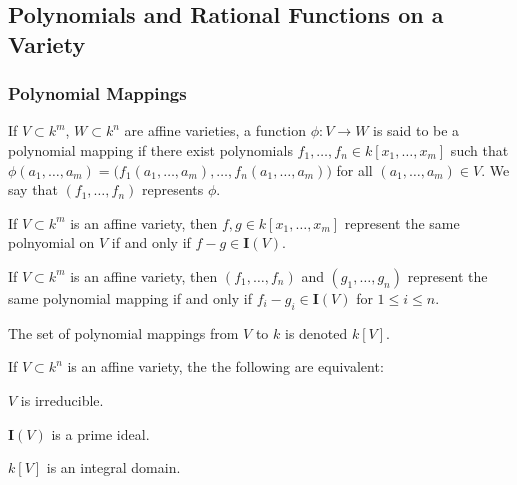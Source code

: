 \documentclass[crop=false,class=book]{standalone}
\begin{document}
\subsection{Polynomials and Rational Functions on a Variety}
\subsubsection{Polynomial Mappings}
\begin{definition}
If $V\subset k^m$, $W\subset k^n$ are affine varieties, a function $\phi:V\rightarrow W$ is said to be a polynomial mapping if there exist polynomials $f_1,\hdots, f_n\in k[x_1,\hdots, x_m]$ such that $\phi(a_1,\hdots, a_m) = \big(f_1(a_1,\hdots, a_m),\hdots, f_n(a_1,\hdots, a_m)\big)$ for all $(a_1,\hdots, a_m) \in V$. We say that $(f_1,\hdots, f_n)$ represents $\phi$.
\end{definition}
\begin{theorem}
If $V\subset k^m$ is an affine variety, then $f,g\in k[x_1,\hdots, x_m]$ represent the same polnyomial on $V$ if and only if $f-g \in \textbf{I}(V)$.
\end{theorem}
\begin{theorem}
If $V\subset k^m$ is an affine variety, then $(f_1,\hdots, f_n)$ and $(g_1,\hdots, g_n)$ represent the same polynomial mapping if and only if $f_i-g_i \in \textbf{I}(V)$ for $1\leq i \leq n$.
\end{theorem}
\begin{notation}
The set of polynomial mappings from $V$ to $k$ is denoted $k[V]$.
\end{notation}
\begin{theorem}
If $V\subset k^n$ is an affine variety, the the following are equivalent:
\begin{enumerate}
\begin{multicols}{3}
    \item $V$ is irreducible.
    \item $\textbf{I}(V)$ is a prime ideal.
    \item $k[V]$ is an integral domain.
\end{multicols}
\end{enumerate}
\end{theorem}
\end{document}
